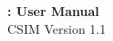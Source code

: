 \begin{flushleft}
{  \Huge  
  \textbf{\csim: User Manual}\\
  {\Large CSIM Version 1.1} \\
}



\end{flushleft}

